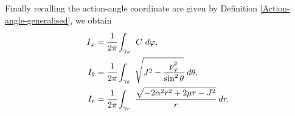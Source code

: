 \documentclass[12pt,oneside]{report}
\theoremstyle{definition}
\begin{document}
 Finally recalling the action-angle coordinate are given by Definition \ref{Action-angle-generalised}, we obtain
 \begin{align}
      I_{\varphi} &= \cfrac{1}{2\pi} \int_{\gamma_{\varphi}} \ C \ d \varphi ,
      \\
       I_{\theta} &= \cfrac{1}{2 \pi} \int_{\gamma_{\theta}} \ \sqrt{J^{2}-\cfrac{p_{\varphi}^{2}}{\sin^{2}{\theta}}} \ d \theta ,\label{theta int}
      \\
        I_{r} &= \cfrac{1}{2 \pi} \int_{\gamma_{r}} \ \cfrac{\sqrt{-2\alpha^{2}r^{2}+2\mu r - J^{2}}}{r}  \ d r.
 \end{align}
 
\end{document}
